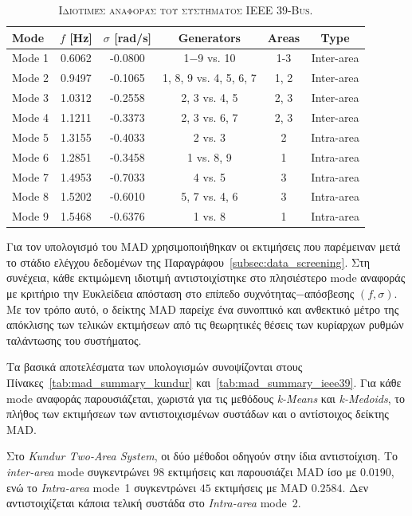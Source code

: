 \documentclass[conference]{IEEEtran}
\begin{document}
\begin{table}[!htbp]
\centering
\caption{\textsc{Ιδιοτιμές αναφοράς του συστήματος IEEE 39-Bus.}}
\label{tab:ieee39_reference_modes}
\scriptsize
\renewcommand{\arraystretch}{1.15}
\setlength{\tabcolsep}{5pt}
\begin{tabular}{lccccc}
\toprule
\textbf{Mode} & \textbf{$f$ [Hz]} & \textbf{$\sigma$ [rad/s]}  & \textbf{Generators} & \textbf{Areas} & \textbf{Type} \\
\midrule
Mode 1 & 0.6062 & -0.0800  & 1$-$9 vs. 10 & 1-3 &  Inter-area\\
Mode 2 & 0.9497 & -0.1065  & 1, 8, 9 vs. 4, 5, 6, 7 & 1, 2 & Inter-area \\
Mode 3 & 1.0312 & -0.2558  & 2, 3 vs. 4, 5 & 2, 3 & Inter-area\\
Mode 4 & 1.1211 & -0.3373  & 2, 3 vs. 6, 7 &  2, 3 & Inter-area \\
Mode 5 & 1.3155 & -0.4033  & 2 vs. 3 &  2 & Intra-area\\
Mode 6 & 1.2851 & -0.3458  & 1 vs. 8, 9 & 1 & Intra-area\\
Mode 7 & 1.4953 & -0.7033  & 4 vs. 5 & 3 & Intra-area\\
Mode 8 & 1.5202 & -0.6010  & 5, 7 vs. 4, 6 & 3 & Intra-area\\
Mode 9 & 1.5468 & -0.6376  & 1 vs. 8 & 1 & Intra-area\\
\bottomrule
\end{tabular}
\end{table}

Για τον υπολογισμό του MAD χρησιμοποιήθηκαν οι εκτιμήσεις που παρέμειναν μετά το
στάδιο ελέγχου δεδομένων της Παραγράφου~\ref{subsec:data_screening}. Στη συνέχεια,
κάθε εκτιμώμενη ιδιοτιμή αντιστοιχίστηκε στο πλησιέστερο mode αναφοράς με κριτήριο την
Ευκλείδεια απόσταση στο επίπεδο συχνότητας$-$απόσβεσης $(f,\sigma)$. Με τον τρόπο
αυτό, ο δείκτης MAD παρείχε ένα συνοπτικό και ανθεκτικό μέτρο της απόκλισης των τελικών
εκτιμήσεων από τις θεωρητικές θέσεις των κυρίαρχων ρυθμών ταλάντωσης του συστήματος.

Τα βασικά αποτελέσματα των υπολογισμών συνοψίζονται στους Πίνακες~\ref{tab:mad_summary_kundur} και~\ref{tab:mad_summary_ieee39}. Για κάθε mode αναφοράς παρουσιάζεται, χωριστά για τις μεθόδους \textit{k-Means} και \textit{k-Medoids}, το πλήθος των εκτιμήσεων των αντιστοιχισμένων συστάδων και ο αντίστοιχος δείκτης MAD.

Στο \textit{Kundur Two-Area System}, οι δύο μέθοδοι οδηγούν στην ίδια αντιστοίχιση. Το \textit{inter-area} mode συγκεντρώνει $98$ εκτιμήσεις και παρουσιάζει MAD ίσο με $0.0190$, ενώ το \textit{Intra-area} mode~1 συγκεντρώνει $45$ εκτιμήσεις με MAD $0.2584$. Δεν αντιστοιχίζεται κάποια τελική συστάδα στο \textit{Intra-area} mode~2.
\end{document}

